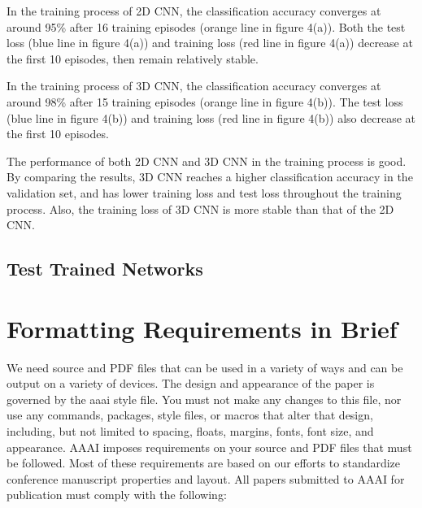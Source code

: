 \documentclass[letterpaper]{article} %
\begin{document}
In the training process of 2D CNN, the classification accuracy converges at around 95\% after 16 training episodes (orange line in figure 4(a)). Both the test loss (blue line in figure 4(a)) and training loss (red line in figure 4(a)) decrease at the first 10 episodes, then remain relatively stable. 

In the training process of 3D CNN, the classification accuracy converges at around 98\% after 15 training episodes (orange line in figure 4(b)). The test loss (blue line in figure 4(b)) and training loss (red line in figure 4(b)) also decrease at the first 10 episodes. 

The performance of both 2D CNN and 3D CNN in the training process is good. By comparing the results, 3D CNN reaches a higher classification accuracy in the validation set, and has lower training loss and test loss throughout the training process. Also, the training loss of 3D CNN is more stable than that of the 2D CNN.

\subsection{Test Trained Networks}





\clearpage
\section{Formatting Requirements in Brief}
We need source and PDF files that can be used in a variety of ways and can be output on a variety of devices. The design and appearance of the paper is governed by the aaai style file. You must not make any changes to this file, nor use any commands, packages, style files, or macros that alter that design, including, but not limited to spacing, floats, margins, fonts, font size, and appearance. AAAI imposes  requirements on your source and PDF files that must be followed. Most of these requirements are based on our efforts to standardize conference manuscript properties and layout. All papers submitted to AAAI for publication must comply with the following:
\end{document}

